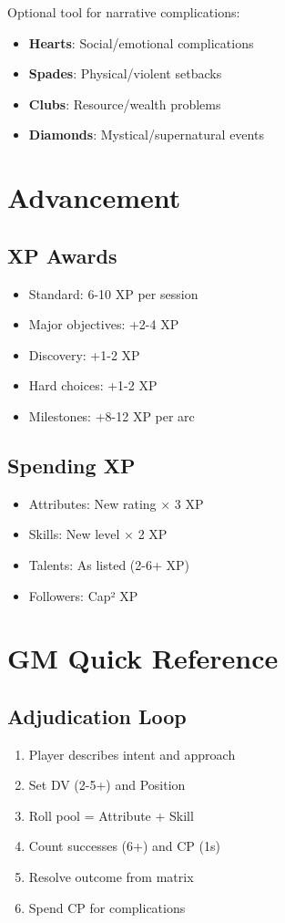 \documentclass[11pt]{article}
\begin{document}
Optional tool for narrative complications:
\begin{itemize}
    \item \textbf{Hearts}: Social/emotional complications
    \item \textbf{Spades}: Physical/violent setbacks  
    \item \textbf{Clubs}: Resource/wealth problems
    \item \textbf{Diamonds}: Mystical/supernatural events
\end{itemize}

\section{Advancement}

\subsection{XP Awards}
\begin{itemize}
    \item Standard: 6-10 XP per session
    \item Major objectives: +2-4 XP
    \item Discovery: +1-2 XP
    \item Hard choices: +1-2 XP
    \item Milestones: +8-12 XP per arc
\end{itemize}

\subsection{Spending XP}
\begin{itemize}
    \item Attributes: New rating × 3 XP
    \item Skills: New level × 2 XP
    \item Talents: As listed (2-6+ XP)
    \item Followers: Cap² XP
\end{itemize}

\section{GM Quick Reference}

\subsection{Adjudication Loop}
\begin{enumerate}
    \item Player describes intent and approach
    \item Set DV (2-5+) and Position
    \item Roll pool = Attribute + Skill
    \item Count successes (6+) and CP (1s)
    \item Resolve outcome from matrix
    \item Spend CP for complications
\end{enumerate}
\end{document}
